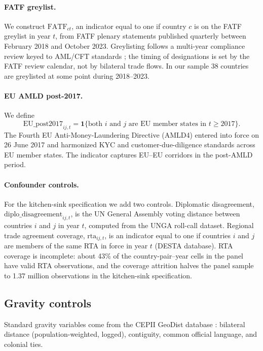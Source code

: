 \paragraph{FATF greylist.}
We construct $\text{FATF}_{ct}$, an indicator equal to one if country $c$ is on the FATF greylist in year $t$, from FATF plenary statements published quarterly between February 2018 and October 2023. Greylisting follows a multi-year compliance review keyed to AML/CFT standards \citep{Borchert2024_broken_relationships}; the timing of designations is set by the FATF review calendar, not by bilateral trade flows. In our sample 38 countries are greylisted at some point during 2018--2023.

\paragraph{EU AMLD post-2017.}
We define
\[
\text{EU\_post2017}_{ij,t} = \mathbf{1}\{\text{both } i \text{ and } j \text{ are EU member states in } t \geq 2017\}.
\]
The Fourth EU Anti-Money-Laundering Directive (AMLD4) entered into force on 26 June 2017 and harmonized KYC and customer-due-diligence standards across EU member states. The indicator captures EU--EU corridors in the post-AMLD period.

\paragraph{Confounder controls.}
For the kitchen-sink specification we add two controls. Diplomatic disagreement, $\text{diplo\_disagreement}_{ij,t}$, is the UN General Assembly voting distance between countries $i$ and $j$ in year $t$, computed from the UNGA roll-call dataset. Regional trade agreement coverage, $\text{rta}_{ij,t}$, is an indicator equal to one if countries $i$ and $j$ are members of the same RTA in force in year $t$ (DESTA database). RTA coverage is incomplete: about 43\% of the country-pair--year cells in the panel have valid RTA observations, and the coverage attrition halves the panel sample to 1.37 million observations in the kitchen-sink specification.

\subsection{Gravity controls}

Standard gravity variables come from the CEPII GeoDist database \citep{Head2014_gravity}: bilateral distance (population-weighted, logged), contiguity, common official language, and colonial ties.

